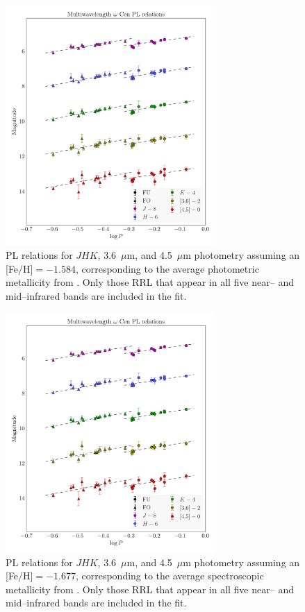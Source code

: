 \documentclass[a4paper,fleqn,usenatbib]{mnras}
\begin{document}
\begin{figure}
\begin{center}
\includegraphics[width=80mm]{final_plots/multiwavelength_PL_samestars_phot.pdf}
\caption{PL relations for $J\!H\!K$, 3.6~$\mu$m, and 4.5~$\mu$m photometry assuming an [Fe/H]$=-1.584$, corresponding to the average photometric metallicity from \citet{2000AJ....119.1824R}. Only those RRL that appear in all five near-- and mid--infrared bands are included in the fit.}
\label{fig:omegaCen_pl_phot}
\end{center}
\end{figure}

\begin{figure}
\begin{center}
\includegraphics[width=80mm]{final_plots/multiwavelength_PL_samestars_spect.pdf}
\caption{PL relations for $J\!H\!K$, 3.6~$\mu$m, and 4.5~$\mu$m photometry assuming an [Fe/H]$=-1.677$, corresponding to the average spectroscopic metallicity from \citet{2006ApJ...640L..43S}.  Only those RRL that appear in all five near-- and mid--infrared bands are included in the fit.}
\label{fig:omegaCen_pl_spect}
\end{center}
\end{figure}
\end{document}
